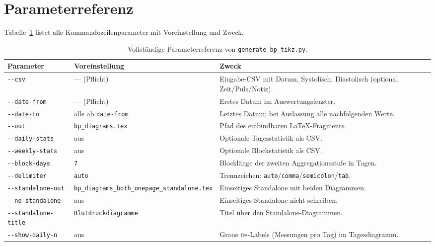 \documentclass[conference]{IEEEtran}
\newcommand{\param}[1]{\texttt{#1}}
\begin{document}
\section{Parameterreferenz}
Tabelle~\ref{tab:params} listet alle Kommandozeilenparameter mit Voreinstellung
und Zweck.

\begin{table}[!t]
\caption{Vollständige Parameterreferenz von \texttt{generate\_bp\_tikz.py}.}
\label{tab:params}
\centering
\footnotesize
\renewcommand{\arraystretch}{1.25}
\begin{tabular}{>{\raggedright\arraybackslash}p{} >{\raggedright\arraybackslash}p{} >{\raggedright\arraybackslash}p{}}
\toprule
\textbf{Parameter} & \textbf{Voreinstellung} & \textbf{Zweck} \\
\midrule
\param{-{}-csv} & --- (Pflicht) & Eingabe-CSV mit Datum, Systolisch, Diastolisch (optional Zeit/Puls/Notiz). \\
\param{-{}-date-from} & --- (Pflicht) & Erstes Datum im Auswertungsfenster. \\
\param{-{}-date-to} & alle ab \texttt{date-from} & Letztes Datum; bei Auslassung alle nachfolgenden Werte. \\
\param{-{}-out} & \texttt{bp\_diagrams.tex} & Pfad des einbindbaren LaTeX-Fragments. \\
\param{-{}-daily-stats} & aus & Optionale Tagesstatistik als CSV. \\
\param{-{}-weekly-stats} & aus & Optionale Blockstatistik als CSV. \\
\param{-{}-block-days} & \texttt{7} & Blocklänge der zweiten Aggregationsstufe in Tagen. \\
\param{-{}-delimiter} & \texttt{auto} & Trennzeichen: \texttt{auto}/\texttt{comma}/\texttt{semicolon}/\texttt{tab}. \\
\param{-{}-standalone-out} & \texttt{bp\_\hspace{0pt}diagrams\_\hspace{0pt}both\_\hspace{0pt}onepage\_\hspace{0pt}standalone.tex} & Einseitiges Standalone mit beiden Diagrammen. \\
\param{-{}-no-standalone} & aus & Einseitiges Standalone nicht schreiben. \\
\param{-{}-standalone-title} & \texttt{Blutdruckdiagramme} & Titel über den Standalone-Diagrammen. \\
\param{-{}-show-daily-n} & aus & Graue \texttt{n=}-Labels (Messungen pro Tag) im Tagesdiagramm. \\

\end{tabular}
\end{table}
\end{document}
